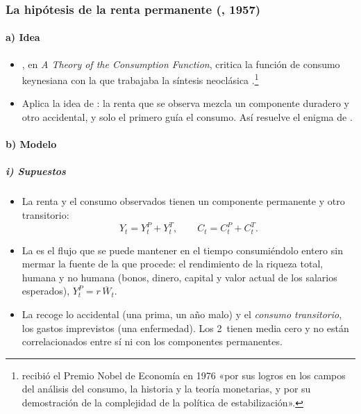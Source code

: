 \documentclass[11pt]{article}
\begin{document}
\subsubsection{La hipótesis de la renta permanente (, 1957)}\label{sec:renta-permanente}

\paragraph{a) Idea}

\begin{itemize}
\item \textcite{Friedman1957}, en \emph{A Theory of the Consumption Function}, critica la función de consumo keynesiana con la que trabajaba la síntesis neoclásica .\footnote{ recibió el Premio Nobel de Economía en 1976 «por sus logros en los campos del análisis del consumo, la historia y la teoría monetarias, y por su demostración de la complejidad de la política de estabilización»\nocite{Nobel1976Friedman}.}
\item Aplica la idea de : la renta que se observa mezcla un componente duradero y otro accidental, y solo el primero guía el consumo. Así resuelve el enigma de .
\end{itemize}

\paragraph{b) Modelo}

\subparagraph{i) Supuestos}

\begin{itemize}
\item La renta y el consumo observados tienen un componente permanente y otro transitorio:
  \begin{equation*}
  Y_t=Y^P_t+Y^T_t,\qquad C_t=C^P_t+C^T_t.
  \end{equation*}
\item La  es el flujo que se puede mantener en el tiempo consumiéndolo entero sin mermar la fuente de la que procede: el rendimiento de la riqueza total, humana y no humana (bonos, dinero, capital y valor actual de los salarios esperados), $Y^P_t=r\,\overline{W}_t$.
\item La  recoge lo accidental (una prima, un año malo) y el \emph{consumo transitorio}, los gastos imprevistos (una enfermedad). Los 2~tienen media cero y no están correlacionados entre sí ni con los componentes permanentes.
\end{itemize}
\end{document}

